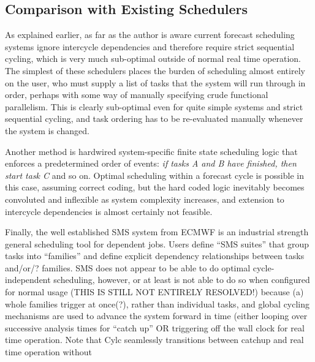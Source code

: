 \documentclass[11pt,a4paper]{article}
\begin{document}
\subsection{Comparison with Existing Schedulers}

As explained earlier, as far as the author is aware current forecast
scheduling systems ignore intercycle dependencies and therefore require
strict sequential cycling, which is very much sub-optimal outside of
normal real time operation. The simplest of these schedulers places the
burden of scheduling almost entirely on the user, who must supply a list
of tasks that the system will run through in order, perhaps with some
way of manually specifying crude functional parallelism.  This is
clearly sub-optimal even for quite simple systems and strict sequential
cycling, and task ordering has to be re-evaluated manually whenever the
system is changed. 

Another method is hardwired system-specific finite state scheduling
logic that enforces a predetermined order of events: {\em if tasks A and
B have finished, then start task C} and so on. Optimal scheduling within
a forecast cycle is possible in this case, assuming correct coding, but
the hard coded logic inevitably becomes convoluted and inflexible as
system complexity increases, and extension to intercycle dependencies is
almost certainly not feasible.  

Finally, the well established SMS system from ECMWF is an industrial
strength general scheduling tool for dependent jobs. Users define ``SMS
suites'' that group tasks into ``families'' and define explicit
dependency relationships between tasks and/or/? families. SMS does not
appear to be able to do optimal cycle-independent scheduling, however,
or at least is not able to do so when configured for normal usage (THIS
IS STILL NOT ENTIRELY RESOLVED!) because (a) whole families trigger 
at once(?), rather than individual tasks, and global cycling mechanisms
are used to advance the system forward in time (either looping
over successive analysis times for ``catch up'' OR
triggering off the wall clock for real time operation. Note that Cylc
seamlessly transitions between catchup and real time operation without

\end{document}

